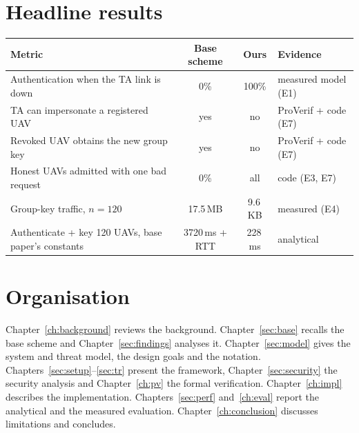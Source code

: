 \section{Headline results}
\begin{center}\small
\begin{tabularx}{\linewidth}{@{}>{\raggedright\arraybackslash}X cc l@{}}
\toprule
Metric & Base scheme & Ours & Evidence\\
\midrule
Authentication when the TA link is down & 0\% & 100\% & measured model (E1)\\
TA can impersonate a registered UAV & yes & no & ProVerif + code (E7)\\
Revoked UAV obtains the new group key & yes & no & ProVerif + code (E7)\\
Honest UAVs admitted with one bad request & 0\% & all & code (E3, E7)\\
Group-key traffic, $n=120$ & 17.5\,MB & 9.6\,KB & measured (E4)\\
Authenticate + key 120 UAVs, base paper's constants & 3720\,ms + RTT & 228\,ms & analytical\\
\bottomrule
\end{tabularx}
\end{center}

\section{Organisation}
Chapter~\ref{ch:background} reviews the background. Chapter~\ref{sec:base} recalls the base scheme and Chapter~\ref{sec:findings} analyses it.
Chapter~\ref{sec:model} gives the system and threat model, the design goals and the notation. Chapters~\ref{sec:setup}--\ref{sec:tr} present the framework,
Chapter~\ref{sec:security} the security analysis and Chapter~\ref{ch:pv} the formal verification. Chapter~\ref{ch:impl} describes the implementation.
Chapters~\ref{sec:perf} and~\ref{ch:eval} report the analytical and the measured evaluation. Chapter~\ref{ch:conclusion} discusses limitations and concludes.

